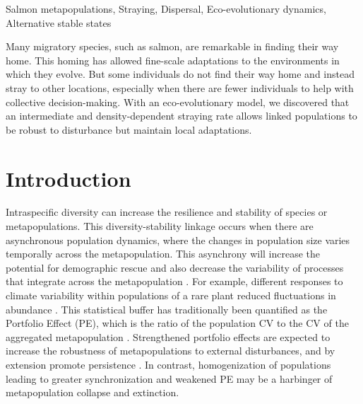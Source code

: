 \documentclass{revtex4}
\begin{document}
\centerline{Salmon metapopulations, Straying, Dispersal, Eco-evolutionary dynamics, Alternative stable states}
\vspace{2mm}
Many migratory species, such as salmon, are remarkable in finding their way home. This homing has allowed fine-scale adaptations to the environments in which they evolve. But some individuals do not find their way home and instead stray to other locations, especially when there are fewer individuals to help with collective decision-making. With an eco-evolutionary model, we discovered that an intermediate and density-dependent straying rate allows linked populations to be robust to disturbance but maintain local adaptations.\\


\section{Introduction}

Intraspecific diversity can increase the resilience and stability of species or metapopulations. 
This diversity-stability linkage occurs when there are asynchronous population dynamics, where the changes in population size varies temporally across the metapopulation. 
This asynchrony will increase the potential for demographic rescue \citep{Brown:1977gk,Earn:2000fm} and also decrease the variability of processes that integrate across the metapopulation \citep{Anonymous:2015gf}. 
For example, different responses to climate variability within populations of a rare plant reduced fluctuations in abundance \citep{Abbott:2017hl}. 
This statistical buffer has traditionally been quantified as the Portfolio Effect (PE), which is the ratio of the population CV to the CV of the aggregated metapopulation \citep{Thibaut:2012km}. 
Strengthened portfolio effects are expected to increase the robustness of metapopulations to external disturbances, and by extension promote persistence \citep{Thibaut:2012km}.
In contrast, homogenization of populations leading to greater synchronization and weakened PE may be a harbinger of metapopulation collapse and extinction.
\end{document}
